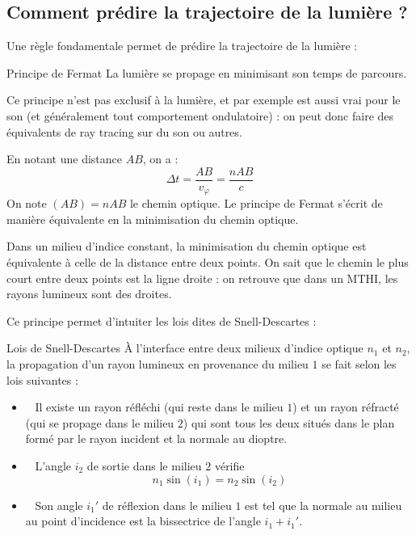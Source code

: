 \documentclass{classe}
\begin{document}
\subsection{Comment prédire la trajectoire de la lumière ?}
Une règle fondamentale permet de prédire la trajectoire de la lumière :
\begin{théorème}{Principe de Fermat}{}
La lumière se propage en minimisant son temps de parcours.
\end{théorème}
\begin{remarque}{}{}
Ce principe n'est pas exclusif à la lumière, et par exemple est aussi vrai pour le son (et généralement tout comportement ondulatoire) : on peut donc faire des équivalents de ray tracing sur du son ou autres.
\end{remarque}{}{}
En notant une distance $AB$, on a :
\begin{equation*}
	\Delta t = \frac{AB}{v_\varphi} = \frac{nAB}{c}
\end{equation*}
On note $(AB) = nAB$ le chemin optique. Le principe de Fermat s'écrit de manière équivalente en la minimisation du chemin optique.\\
\begin{remarque}{}{}
	Dans un milieu d'indice constant, la minimisation du chemin optique est équivalente à celle de la distance entre deux points. On sait que le chemin le plus court entre deux points est la ligne droite : on retrouve que dans un MTHI, les rayons lumineux sont des droites.
\end{remarque}
Ce principe permet d'intuiter les lois dites de Snell-Descartes :
\begin{théorème}{Lois de Snell-Descartes}{}
À l'interface entre deux milieux d'indice optique $n_1$ et $n_2$, la propagation d'un rayon lumineux en provenance du milieu $1$ se fait selon les lois suivantes :
\begin{itemize}
	\item\color{vulm}{Plan d'incidence :}\ \color{black} Il existe un rayon réfléchi (qui reste dans le milieu $1$) et un rayon réfracté (qui se propage dans le milieu $2$) qui sont tous les deux situés dans le plan formé par le rayon incident et la normale au dioptre.
	\item \color{vulm}{Réfraction :}\ \color{black} L'angle $i_{2}$ de sortie dans le milieu $2$ vérifie \[n_{1}\sin{\left(i_{1}\right)} = n_{2}\sin{\left(i_{2}\right)}\]
    \item \color{vulm}{Réflexion :}\ \color{black} Son angle $i_{1}'$ de réflexion dans le milieu $1$ est tel que la normale au milieu au point d'incidence est la bissectrice de l'angle $i_{1} + i_{1}'$.
\end{itemize}
\end{théorème}
\end{document}
